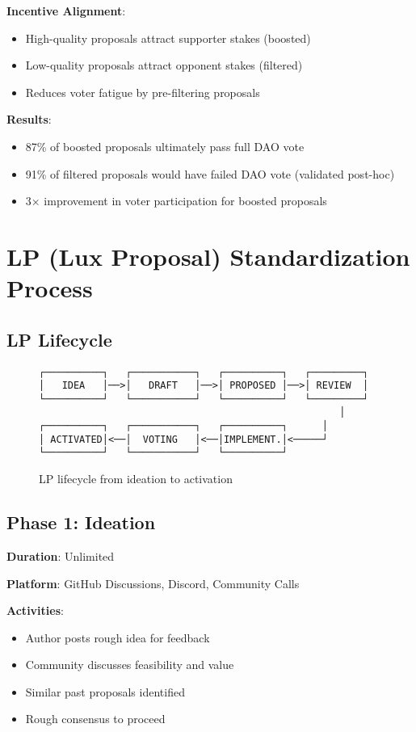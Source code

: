 \documentclass[11pt,a4paper]{article}
\begin{document}
\textbf{Incentive Alignment}:
\begin{itemize}
\item High-quality proposals attract supporter stakes (boosted)
\item Low-quality proposals attract opponent stakes (filtered)
\item Reduces voter fatigue by pre-filtering proposals
\end{itemize}

\textbf{Results}:
\begin{itemize}
\item 87\% of boosted proposals ultimately pass full DAO vote
\item 91\% of filtered proposals would have failed DAO vote (validated post-hoc)
\item 3× improvement in voter participation for boosted proposals
\end{itemize}

\section{LP (Lux Proposal) Standardization Process}

\subsection{LP Lifecycle}

\begin{figure}[h]
\centering
\begin{verbatim}
┌──────────┐   ┌───────────┐   ┌──────────┐   ┌─────────┐
│   IDEA   │──>│   DRAFT   │──>│ PROPOSED │──>│ REVIEW  │
└──────────┘   └───────────┘   └──────────┘   └─────────┘
                                                    │
┌──────────┐   ┌───────────┐   ┌──────────┐      │
│ ACTIVATED│<──│  VOTING   │<──│IMPLEMENT.│<─────┘
└──────────┘   └───────────┘   └──────────┘
\end{verbatim}
\caption{LP lifecycle from ideation to activation}
\end{figure}

\subsection{Phase 1: Ideation}

\textbf{Duration}: Unlimited

\textbf{Platform}: GitHub Discussions, Discord, Community Calls

\textbf{Activities}:
\begin{itemize}
\item Author posts rough idea for feedback
\item Community discusses feasibility and value
\item Similar past proposals identified
\item Rough consensus to proceed
\end{itemize}
\end{document}
